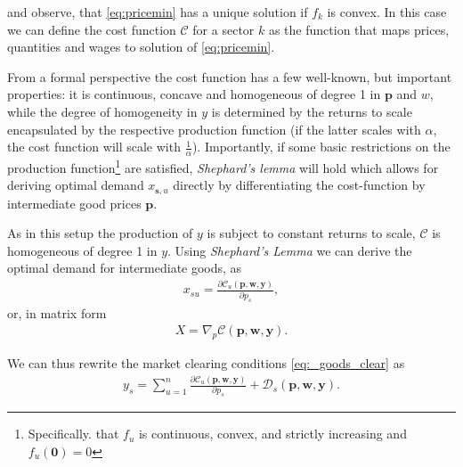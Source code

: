 \documentclass{article}
\newcommand{\costf}{\mathscr{C}}
\newcommand{\prices}{\mathbf{p}}
\newcommand{\quant}{\mathbf{y}}
\newcommand{\wages}{\mathbf{w}}
\newcommand{\demandf}{\mathscr{D}}
\begin{document}
and observe, that \eqref{eq:pricemin} has a unique solution if $f_k$ is convex.
In this case we can define the cost function $\costf$ for a sector $k$ as the function that maps prices, quantities and wages to solution of \eqref{eq:pricemin}. 

From a formal perspective the cost function has a few well-known, but important properties:
it is continuous, concave and homogeneous of degree 1 in $\mathbf p$ and $w$, while the degree of homogeneity in $y$ is determined by the returns to scale encapsulated by the respective production function (if the latter scales with $\alpha$, the cost function will scale with $\frac{1}{\alpha}$). 
Importantly, if some basic restrictions on the production function\footnote{Specifically. that $f_u$ is continuous, convex, and strictly increasing and $f_u(\mathbf 0) = 0$} are satisfied, \textit{Shephard's lemma} will hold which allows for deriving optimal demand $x_{\mathbf{s},u}$ directly by differentiating the cost-function by intermediate good prices $\mathbf{p}$.

As in this setup the production of $y$ is subject to constant returns to scale, $\mathscr C$ is homogeneous of degree 1 in $ y$. Using \textit{Shephard's Lemma} we can derive the optimal demand for intermediate goods, as 
\begin{align}
  x_{su} = \frac{\partial \costf_u(\mathbf p,\mathbf w,\mathbf y)}{\partial p_s},
\end{align}
or, in matrix form
\begin{align}
  X = \nabla_p \costf(\mathbf p,\mathbf w,\mathbf y).
\end{align}

We can thus rewrite the market clearing conditions \eqref{eq:_goods_clear} as
\begin{align}
\label{eq:market_clearing_sheppard}
  y_s = \sum_{u = 1}^n \frac{\partial \costf_u(\mathbf p,\mathbf w,\mathbf y)}{\partial p_s} + \demandf_s(\prices,\wages,\quant).
\end{align}
\end{document}
